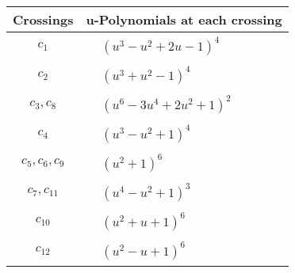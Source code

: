 \documentclass[1p]{elsarticle_modified}
\theoremstyle{definition}
\begin{document}
\begin{tabular}{m{50pt}|m{274pt}}
Crossings & \hspace{64pt}u-Polynomials at each crossing \\
\hline $$\begin{aligned}c_{1}\end{aligned}$$&$\begin{aligned}
&(u^3- u^2+2 u-1)^4
\end{aligned}$\\
\hline $$\begin{aligned}c_{2}\end{aligned}$$&$\begin{aligned}
&(u^3+u^2-1)^4
\end{aligned}$\\
\hline $$\begin{aligned}c_{3},c_{8}\end{aligned}$$&$\begin{aligned}
&(u^6-3 u^4+2 u^2+1)^2
\end{aligned}$\\
\hline $$\begin{aligned}c_{4}\end{aligned}$$&$\begin{aligned}
&(u^3- u^2+1)^4
\end{aligned}$\\
\hline $$\begin{aligned}c_{5},c_{6},c_{9}\end{aligned}$$&$\begin{aligned}
&(u^2+1)^6
\end{aligned}$\\
\hline $$\begin{aligned}c_{7},c_{11}\end{aligned}$$&$\begin{aligned}
&(u^4- u^2+1)^3
\end{aligned}$\\
\hline $$\begin{aligned}c_{10}\end{aligned}$$&$\begin{aligned}
&(u^2+u+1)^6
\end{aligned}$\\
\hline $$\begin{aligned}c_{12}\end{aligned}$$&$\begin{aligned}
&(u^2- u+1)^6
\end{aligned}$\\
\hline
\end{tabular}\\~\\
\end{document}
